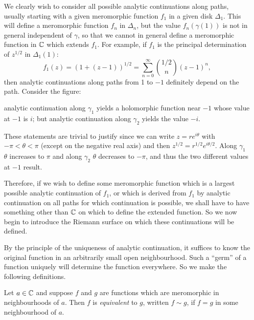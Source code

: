 \documentclass[a4paper,11pt]{article}
\begin{document}
We clearly wish to consider all possible analytic continuations along
paths, usually starting with a given meromorphic function $f_1$ in a
given disk $\Delta_1$.  This will define a meromorphic function $f_n$
in $\Delta_n$, but the value $f_n(\gamma(1))$ is not in general
independent of $\gamma$, so that we cannot in general define a
meromorphic function in ${\mathbb C}$ which extends $f_1$.
For example, if $f_1$ is the principal determination of $z^{1/2}$ in
$\Delta_1(1)$:
$$
f_1(z) = (1 + (z-1))^{1/2} = \sum_{n=0}^{\infty} \binom{1/2}{n}(z-1)^n,
$$
then analytic continuations along paths from 1 to $-1$ definitely
depend on the path.  Consider the figure:

\begin{mdframed}
  \begin{minipage}{7cm}
  \vspace{3cm}    
  \end{minipage}%
  \begin{minipage}{7cm}
    analytic continuation along $\gamma_1$ yields a holomorphic
    function near $-1$ whose value at $-1$ is $i$; but analytic
    continuation along $\gamma_2$ yields the value $-i$.
  \end{minipage}
\end{mdframed}

These statements are trivial to justify since we can write $z =
re^{i\theta}$ with $-\pi < \theta < \pi$ (except on the negative real
axis) and then $z^{1/2} = r^{1/2} e^{i\theta/2}$.  Along $\gamma_1$
$\theta$ increases to $\pi$ and along $\gamma_2$ $\theta$ decreases to
$-\pi$, and thus the two different values at $-1$ result.

Therefore, if we wish to define some meromorphic function which is a
largest possible analytic continuation of $f_1$, or which is derived
from $f_1$ by analytic continuation on all paths for which
continuation is possible, we shall have to have something other than
${\mathbb C}$ on which to define the extended function.  So we now begin to
introduce the Riemann surface on which these continuations will be
defined.

By the principle of the uniqueness of analytic continuation, it
suffices to know the original function in an arbitrarily small open
neighbourhood.  Such a ``germ'' of a function uniquely will determine
the function everywhere.  So we make the following definitions.

\begin{defn}
  \label{def:2}
  Let $a\in {\mathbb C}$ and suppose $f$ and $g$ are functions which are
  meromorphic in neighbourhoods of $a$.  Then $f$ is \emph{equivalent}
  to $g$, written $f \sim g$, if $f=g$ in some neighbourhood of $a$.
\end{defn}
\end{document}
